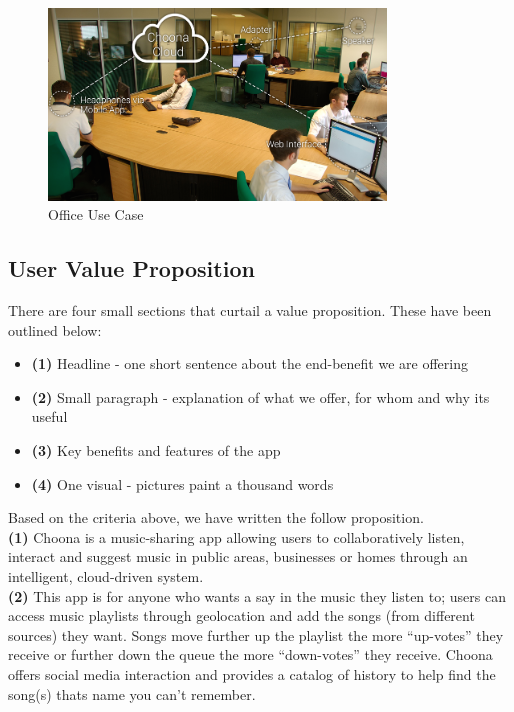     \begin{figure}[h!]
      \centering
      \includegraphics[width=0.8\textwidth]{./img/office.png}
      \caption{Office Use Case}
      \label{fig:office}
    \end{figure}

\subsection{User Value Proposition}
There are four small sections that curtail a value proposition.  These have been outlined below:
\begin{itemize}
\item \textbf{(1)} Headline - one short sentence about the end-benefit we are offering
\item \textbf{(2)} Small paragraph - explanation of what we offer, for whom and why its useful
\item \textbf{(3)} Key benefits and features of the app
\item \textbf{(4)} One visual - pictures paint a thousand words
\end{itemize}
Based on the criteria above, we have written the follow proposition.\\

\textbf{(1)} Choona is a music-sharing app allowing users to collaboratively listen, interact and suggest music in public areas, businesses or homes through an intelligent, cloud-driven system.  \\

\textbf{(2)} This app is for anyone who wants a say in the music they listen to; users can access music playlists through geolocation and add the songs (from different sources) they want.  Songs move further up the playlist the more ``up-votes'' they receive or further down the queue the more ``down-votes'' they receive.  Choona offers social media interaction and provides a catalog of history to help find the song(s) thats name you can't remember.  \\

